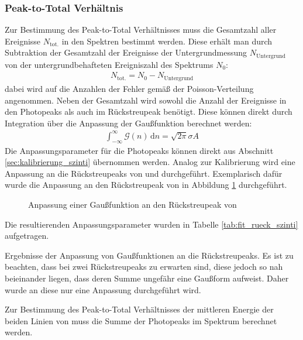 \documentclass[11pt, a4paper]{article}
\numberwithin{equation}{section}
\newcommand{\co}{\isotope[60]{Co}}
\begin{document}
\subsubsection{Peak-to-Total Verhältnis}
\label{sec:ptt_szinti}
Zur Bestimmung des Peak-to-Total Verhältnisses muss die Gesamtzahl aller Ereignisse $N_\mathrm{tot.}$ in den Spektren bestimmt werden.
Diese erhält man durch Subtraktion der Gesamtzahl der Ereignisse der Untergrundmessung $N_\mathrm{Untergrund}$ von der untergrundbehafteten Ereigniszahl des Spektrums $N_0$:
\begin{align}
	N_\mathrm{tot.} = N_\mathrm{0} - N_\mathrm{Untergrund}
\end{align}
dabei wird auf die Anzahlen der Fehler gemäß der Poisson-Verteilung angenommen.
Neben der Gesamtzahl wird sowohl die Anzahl der Ereignisse in den Photopeaks als auch im Rückstreupeak benötigt.
Diese können direkt durch Integration über die Anpassung der Gaußfunktion berechnet werden:
\begin{align}
\int_{-\infty}^{\infty} \mathcal{G}(n) \, \mathrm{d}n = \sqrt{2 \pi} \sigma A
\label{eq:integral_peak}
\end{align}
Die Anpassungsparameter für die Photopeaks können direkt aus Abschnitt \ref{sec:kalibrierung_szinti} übernommen werden.
Analog zur Kalibrierung wird eine Anpassung an die Rückstreupeaks von  und  durchgeführt.
Exemplarisch dafür wurde die Anpassung an den Rückstreupeak von  in Abbildung \ref{fig:fit_rueck_szinti} durchgeführt.
\begin{figure}[h]
	\centering
	
	\caption{Anpassung einer Gaußfunktion an den Rückstreupeak von }
	\label{fig:fit_rueck_szinti}
\end{figure}
Die resultierenden Anpassungsparameter wurden in Tabelle \ref{tab:fit_rueck_szinti} aufgetragen.
\begin{table}[ht]
	\centering
	
	\caption{Ergebnisse der Anpassung von Gaußfunktionen an die Rückstreupeaks. Es ist zu beachten, dass bei \co{} zwei Rückstreupeaks zu erwarten sind, diese jedoch so nah beieinander liegen, dass deren Summe ungefähr eine Gaußform aufweist. Daher wurde an diese nur eine Anpassung durchgeführt wird.}
	\label{tab:fit_rueck_szinti}
\end{table}
Zur Bestimmung des Peak-to-Total Verhältnisses der mittleren Energie der beiden Linien von  muss die Summe der Photopeaks im Spektrum berechnet werden.
\end{document}
